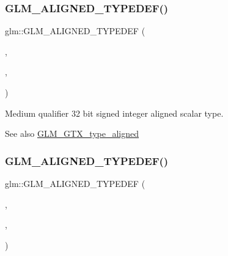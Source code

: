\subsubsection{\texorpdfstring{G\+L\+M\+\_\+\+A\+L\+I\+G\+N\+E\+D\+\_\+\+T\+Y\+P\+E\+D\+E\+F()}{GLM\_ALIGNED\_TYPEDEF()}\hspace{0.1cm}{\footnotesize\ttfamily [19/209]}}
{\footnotesize\ttfamily glm\+::\+G\+L\+M\+\_\+\+A\+L\+I\+G\+N\+E\+D\+\_\+\+T\+Y\+P\+E\+D\+EF (\begin{DoxyParamCaption}\item[{\hyperlink{group__gtc__type__precision_gafd9b4bd9e4465aec63351b59100692c4}{mediump\+\_\+int32\+\_\+t}}]{,  }\item[{aligned\+\_\+mediump\+\_\+int32\+\_\+t}]{,  }\item[{4}]{ }\end{DoxyParamCaption})}

Medium qualifier 32 bit signed integer aligned scalar type. \begin{DoxySeeAlso}{See also}
\hyperlink{group__gtx__type__aligned}{G\+L\+M\+\_\+\+G\+T\+X\+\_\+type\+\_\+aligned} 
\end{DoxySeeAlso}
\mbox{\label{group__gtx__type__aligned_ga73fdc86a539808af58808b7c60a1c4d8}} 
\subsubsection{\texorpdfstring{G\+L\+M\+\_\+\+A\+L\+I\+G\+N\+E\+D\+\_\+\+T\+Y\+P\+E\+D\+E\+F()}{GLM\_ALIGNED\_TYPEDEF()}\hspace{0.1cm}{\footnotesize\ttfamily [20/209]}}
{\footnotesize\ttfamily glm\+::\+G\+L\+M\+\_\+\+A\+L\+I\+G\+N\+E\+D\+\_\+\+T\+Y\+P\+E\+D\+EF (\begin{DoxyParamCaption}\item[{\hyperlink{group__gtc__type__precision_ga555a2f85641550c232db473a9bb981f7}{mediump\+\_\+int64\+\_\+t}}]{,  }\item[{aligned\+\_\+mediump\+\_\+int64\+\_\+t}]{,  }\item[{8}]{ }\end{DoxyParamCaption})}

